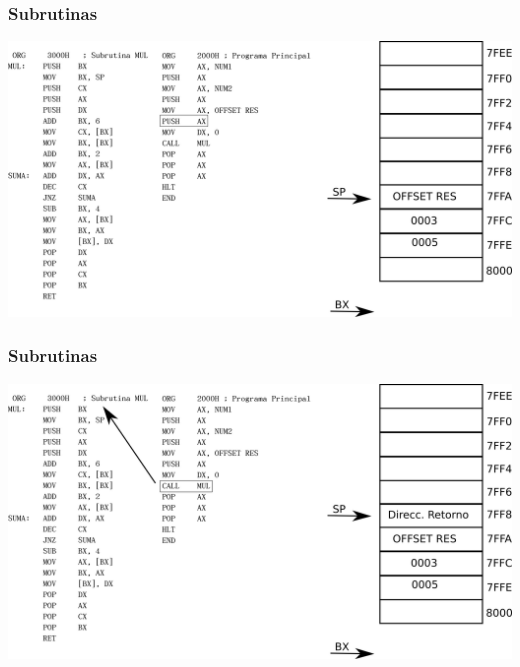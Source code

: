 \documentclass{beamer}
\begin{document}
\begin{frame}
\frametitle{Subrutinas}
\includegraphics[scale=0.70]{imgs/imagen_004.png}
\end{frame}

\begin{frame}
\frametitle{Subrutinas}
\includegraphics[scale=0.70]{imgs/imagen_005.png}
\end{frame}
\end{document}

